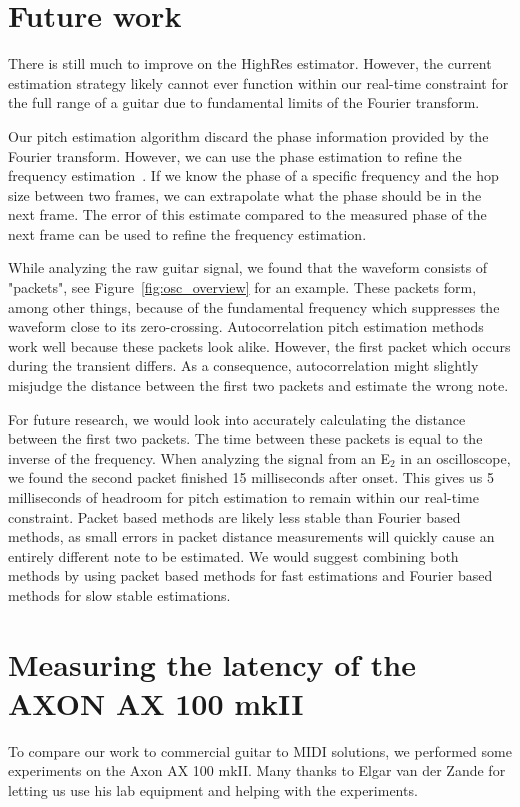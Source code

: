 \documentclass[a4paper,10pt,twocolumn]{article}
\newcommand{\note}[2]{#1${}_{#2}$}
\begin{document}
\section{Future work}  \label{sec:future}
There is still much to improve on the HighRes estimator. However, the current estimation strategy likely cannot ever function within our real-time constraint for the full range of a guitar due to fundamental limits of the Fourier transform.

Our pitch estimation algorithm discard the phase information provided by the Fourier transform. However, we can use the phase estimation to refine the frequency estimation~\cite{phaseinfo}. If we know the phase of a specific frequency and the hop size between two frames, we can extrapolate what the phase should be in the next frame. The error of this estimate compared to the measured phase of the next frame can be used to refine the frequency estimation.

While analyzing the raw guitar signal, we found that the waveform consists of "packets", see Figure~\ref{fig:osc_overview} for an example. These packets form, among other things, because of the fundamental frequency which suppresses the waveform close to its zero-crossing. Autocorrelation pitch estimation methods work well because these packets look alike. However, the first packet which occurs during the transient differs. As a consequence, autocorrelation might slightly misjudge the distance between the first two packets and estimate the wrong note.

For future research, we would look into accurately calculating the distance between the first two packets. The time between these packets is equal to the inverse of the frequency. When analyzing the signal from an \note{E}{2} in an oscilloscope, we found the second packet finished 15 milliseconds after onset. This gives us 5 milliseconds of headroom for pitch estimation to remain within our real-time constraint. Packet based methods are likely less stable than Fourier based methods, as small errors in packet distance measurements will quickly cause an entirely different note to be estimated. We would suggest combining both methods by using packet based methods for fast estimations and Fourier based methods for slow stable estimations.




\appendix
\section{Measuring the latency of the AXON AX 100 mkII}  \label{sec:ax100}
To compare our work to commercial guitar to MIDI solutions, we performed some experiments on the Axon AX 100 mkII. Many thanks to Elgar van der Zande for letting us use his lab equipment and helping with the experiments.
\end{document}
